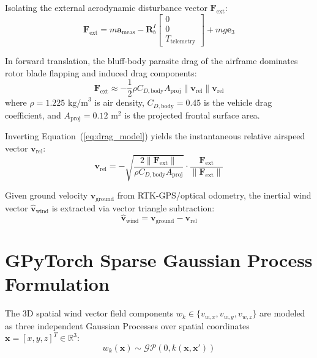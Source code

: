 \documentclass[12pt,a4paper,oneside]{report}
\begin{document}
Isolating the external aerodynamic disturbance vector $\mathbf{F}_{\text{ext}}$:
\begin{equation}
    \mathbf{F}_{\text{ext}} = m \mathbf{a}_{\text{meas}} - \mathbf{R}_b^I \begin{bmatrix} 0 \\ 0 \\ T_{\text{telemetry}} \end{bmatrix} + m g \mathbf{e}_3
    \label{eq:force_ext}
\end{equation}

In forward translation, the bluff-body parasite drag of the airframe dominates rotor blade flapping and induced drag components:
\begin{equation}
    \mathbf{F}_{\text{ext}} \approx -\frac{1}{2} \rho C_{D, \text{body}} A_{\text{proj}} \|\mathbf{v}_{\text{rel}}\| \mathbf{v}_{\text{rel}}
    \label{eq:drag_model}
\end{equation}
where $\rho = 1.225\text{ kg/m}^3$ is air density, $C_{D, \text{body}} = 0.45$ is the vehicle drag coefficient, and $A_{\text{proj}} = 0.12\text{ m}^2$ is the projected frontal surface area.

Inverting Equation~(\ref{eq:drag_model}) yields the instantaneous relative airspeed vector $\mathbf{v}_{\text{rel}}$:
\begin{equation}
    \mathbf{v}_{\text{rel}} = -\sqrt{\frac{2 \|\mathbf{F}_{\text{ext}}\|}{\rho C_{D, \text{body}} A_{\text{proj}}}} \cdot \frac{\mathbf{F}_{\text{ext}}}{\|\mathbf{F}_{\text{ext}}\|}
    \label{eq:v_rel}
\end{equation}

Given ground velocity $\mathbf{v}_{\text{ground}}$ from RTK-GPS/optical odometry, the inertial wind vector $\hat{\mathbf{v}}_{\text{wind}}$ is extracted via vector triangle subtraction:
\begin{equation}
    \hat{\mathbf{v}}_{\text{wind}} = \mathbf{v}_{\text{ground}} - \mathbf{v}_{\text{rel}}
    \label{eq:wind_est}
\end{equation}

\section{GPyTorch Sparse Gaussian Process Formulation}
The 3D spatial wind vector field components $w_k \in \{v_{w,x}, v_{w,y}, v_{w,z}\}$ are modeled as three independent Gaussian Processes over spatial coordinates $\mathbf{x} = [x, y, z]^T \in \mathbb{R}^3$:
\begin{equation}
    w_k(\mathbf{x}) \sim \mathcal{GP}\left(0, k(\mathbf{x}, \mathbf{x}')\right)
\end{equation}
\end{document}
